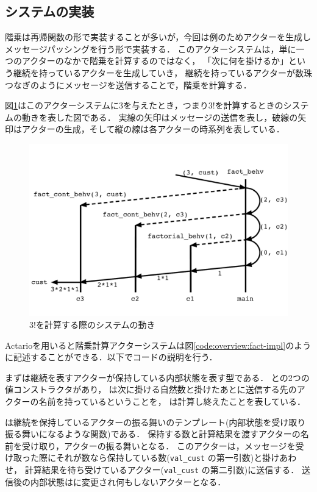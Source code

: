 \subsection{システムの実装}

階乗は再帰関数の形で実装することが多いが，今回は例のためアクターを生成しメッセージパッシングを行う形で実装する．
このアクターシステムは，単に一つのアクターのなかで階乗を計算するのではなく，
「次に何を掛けるか」という継続を持っているアクターを生成していき，
継続を持っているアクターが数珠つなぎのようにメッセージを送信することで，階乗を計算する．

図\ref{img:overview:fact}はこのアクターシステムに$3$を与えたとき，つまり$3!$を計算するときのシステムの動きを表した図である．
実線の矢印はメッセージの送信を表し，破線の矢印はアクターの生成，そして縦の線は各アクターの時系列を表している．

\begin{figure}[tp]
  \centering
  \includegraphics[width=15cm]{./img/overview/fact.pdf}
  \caption{$3!$を計算する際のシステムの動き}\label{img:overview:fact}
\end{figure}

Actarioを用いると階乗計算アクターシステムは図\ref{code:overview:fact-impl}のように記述することができる．以下でコードの説明を行う．

まずは継続を表すアクターが保持している内部状態を表す型である．
との2つの値コンストラクタがあり，
は次に掛ける自然数と掛けたあとに送信する先のアクターの名前を持っているということを，
は計算し終えたことを表している．

は継続を保持しているアクターの振る舞いのテンプレート(内部状態を受け取り振る舞いになるような関数)である．
保持する数と計算結果を渡すアクターの名前を受け取り，アクターの振る舞いとなる．
このアクターは，メッセージを受け取った際にそれが数なら保持している数(\lstinline{val_cust} の第一引数)と掛けあわせ，
計算結果を待ち受けているアクター(\lstinline{val_cust} の第二引数)に送信する．
送信後の内部状態はに変更され何もしないアクターとなる．

